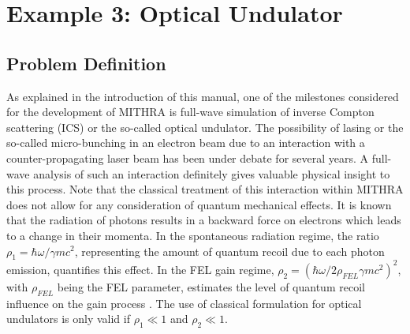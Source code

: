 \section{Example 3: Optical Undulator}

\subsection{Problem Definition}

As explained in the introduction of this manual, one of the milestones considered for the development of MITHRA is full-wave simulation of inverse Compton scattering (ICS) or the so-called optical undulator.
%
The possibility of lasing or the so-called micro-bunching in an electron beam due to an interaction with a counter-propagating laser beam has been under debate for several years.
%
A full-wave analysis of such an interaction definitely gives valuable physical insight to this process.
%
Note that the classical treatment of this interaction within MITHRA does not allow for any consideration of quantum mechanical effects.
%
It is known that the radiation of photons results in a backward force on electrons which leads to a change in their momenta.
%
In the spontaneous radiation regime, the ratio $\rho_1 = \hbar\omega/\gamma mc^2$, representing the amount of quantum recoil due to each photon emission, quantifies this effect.
%
In the FEL gain regime, $\rho_2 = (\hbar\omega/2 \rho_{FEL} \gamma mc^2)^2$, with $\rho_{FEL}$ being the FEL parameter, estimates the level of quantum recoil influence on the gain process \cite{bonifacio2006quantum,bonifacio2005quantum}.
%
The use of classical formulation for optical undulators is only valid if $\rho_1 \ll 1$ and $\rho_2 \ll 1$.

